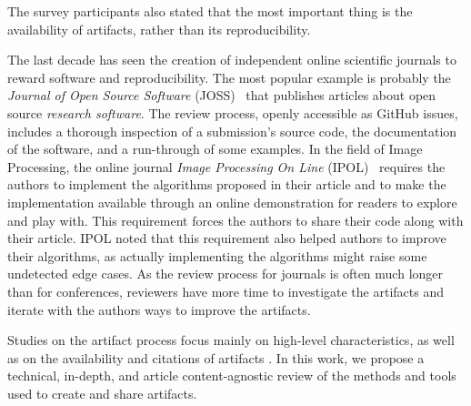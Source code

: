 \documentclass[sigconf,natbib=false]{acmart}
\newcommand{\ad}{AD}
\newcommand{\aeval}{AE}
\newcommand{\adae}{\ad/\aeval}
\newcommand{\todo}[1]{{\color{red}{TODO: #1}}}
\begin{document}
The survey participants \cite{hermann2020community} also stated that the most important thing is the availability of artifacts, rather than its reproducibility.

The last decade has seen the creation of independent online scientific journals to reward software and reproducibility.
The most popular example is probably the \emph{Journal of Open Source Software} (JOSS)\ \cite{smith2018journal} that publishes articles about open source \emph{research software}.
The review process, openly accessible as GitHub issues, includes a thorough inspection of a submission's source code, the documentation of the software, and a run-through of some examples.
In the field of Image Processing, the online journal \emph{Image Processing On Line} (IPOL)\ \cite{colom2015ipol} requires the authors to implement the algorithms proposed in their article and to make the implementation available through an online demonstration for readers to explore and play with.
This requirement forces the authors to share their code along with their article.
IPOL noted that this requirement also helped authors to improve their algorithms, as actually implementing the algorithms might raise some undetected edge cases.
As the review process for journals is often much longer than for conferences, reviewers have more time to investigate the artifacts and iterate with the authors ways to improve the artifacts.



Studies on the artifact process focus mainly on high-level characteristics, as well as on the availability and citations of artifacts \cite{kidwell2016badges, rowhani2017incentives, winter2022retrospective, frachtenberg2022research, heumuller2020publish}. 
In this work, we propose a technical, in-depth, and article content-agnostic review of the methods and tools used to create and share artifacts.


%
%
\end{document}
